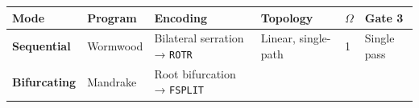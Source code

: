 \begin{longtable}[]{@{}llllll@{}}
\toprule
\begin{minipage}[b]{0.09\columnwidth}\raggedright
Mode\strut
\end{minipage} & \begin{minipage}[b]{0.14\columnwidth}\raggedright
Program\strut
\end{minipage} & \begin{minipage}[b]{0.16\columnwidth}\raggedright
Encoding\strut
\end{minipage} & \begin{minipage}[b]{0.16\columnwidth}\raggedright
Topology\strut
\end{minipage} & \begin{minipage}[b]{0.16\columnwidth}\raggedright
\(\Omega\)\strut
\end{minipage} & \begin{minipage}[b]{0.13\columnwidth}\raggedright
Gate 3\strut
\end{minipage}\tabularnewline
\midrule
\endhead
\begin{minipage}[t]{0.09\columnwidth}\raggedright
\textbf{Sequential}\strut
\end{minipage} & \begin{minipage}[t]{0.14\columnwidth}\raggedright
Wormwood\strut
\end{minipage} & \begin{minipage}[t]{0.16\columnwidth}\raggedright
Bilateral serration → \texttt{ROTR}\strut
\end{minipage} & \begin{minipage}[t]{0.16\columnwidth}\raggedright
Linear, single-path\strut
\end{minipage} & \begin{minipage}[t]{0.16\columnwidth}\raggedright
1\strut
\end{minipage} & \begin{minipage}[t]{0.13\columnwidth}\raggedright
Single pass\strut
\end{minipage}\tabularnewline
\begin{minipage}[t]{0.09\columnwidth}\raggedright
\textbf{Bifurcating}\strut
\end{minipage} & \begin{minipage}[t]{0.14\columnwidth}\raggedright
Mandrake\strut
\end{minipage} & \begin{minipage}[t]{0.16\columnwidth}\raggedright
Root bifurcation → \texttt{FSPLIT}\strut
\end{minipage} & \begin{minipage}[t]{0.16\columnwidth}\raggedright

\end{minipage}
\end{longtable}
